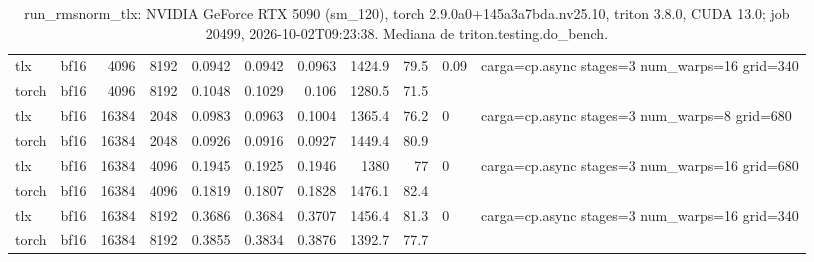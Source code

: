\begin{table}[htbp]
\begin{tabular}{llrrrrrrrll}
    tlx & bf16 & 4096 & 8192 & 0.0942 & 0.0942 & 0.0963 & 1424.9 & 79.5 & 0.09 & carga=cp.async stages=3 num\_warps=16 grid=340 \\
    torch & bf16 & 4096 & 8192 & 0.1048 & 0.1029 & 0.106 & 1280.5 & 71.5 &  &  \\
    tlx & bf16 & 16384 & 2048 & 0.0983 & 0.0963 & 0.1004 & 1365.4 & 76.2 & 0 & carga=cp.async stages=3 num\_warps=8 grid=680 \\
    torch & bf16 & 16384 & 2048 & 0.0926 & 0.0916 & 0.0927 & 1449.4 & 80.9 &  &  \\
    tlx & bf16 & 16384 & 4096 & 0.1945 & 0.1925 & 0.1946 & 1380 & 77 & 0 & carga=cp.async stages=3 num\_warps=16 grid=680 \\
    torch & bf16 & 16384 & 4096 & 0.1819 & 0.1807 & 0.1828 & 1476.1 & 82.4 &  &  \\
    tlx & bf16 & 16384 & 8192 & 0.3686 & 0.3684 & 0.3707 & 1456.4 & 81.3 & 0 & carga=cp.async stages=3 num\_warps=16 grid=340 \\
    torch & bf16 & 16384 & 8192 & 0.3855 & 0.3834 & 0.3876 & 1392.7 & 77.7 &  &  \\
    \bottomrule
  \end{tabular}
  \caption{run\_rmsnorm\_tlx: NVIDIA GeForce RTX 5090 (sm\_120), torch 2.9.0a0+145a3a7bda.nv25.10, triton 3.8.0, CUDA 13.0; job 20499, 2026-10-02T09:23:38. Mediana de triton.testing.do\_bench.}
  \label{tab:pascal-run-rmsnorm-tlx}
\end{table}

